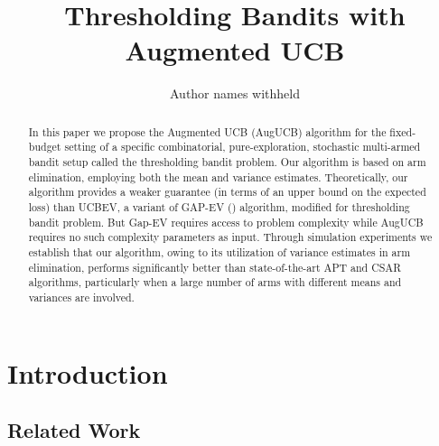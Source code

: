 \documentclass{article}
\title{Thresholding Bandits with Augmented UCB}
\author{Author names withheld}
\begin{document}
\maketitle

\begin{abstract}
In this paper we propose the Augmented UCB (AugUCB) algorithm for the fixed-budget setting of a specific combinatorial, pure-exploration, stochastic multi-armed bandit setup called the thresholding bandit problem. Our algorithm is based on arm elimination, employing both the mean and variance estimates. Theoretically, our algorithm provides a weaker guarantee (in terms of an upper bound on the expected loss) than UCBEV, a variant of GAP-EV (\cite{gabillon2011multi}) algorithm, modified for thresholding bandit problem. But Gap-EV requires access to problem complexity while AugUCB requires no such complexity parameters as input. Through simulation experiments we establish that our algorithm, owing to its utilization of variance estimates in arm elimination, performs significantly better than state-of-the-art APT and CSAR algorithms, particularly when a large number of arms with different means and variances are involved. 


\end{abstract}


\section{Introduction}
\label{intro}


\subsection{Related Work}
\label{prevRes}

\end{document}
